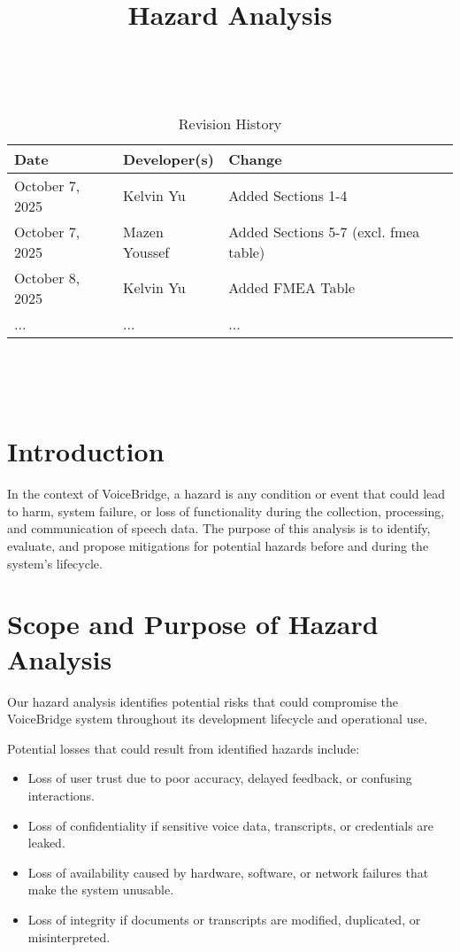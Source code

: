 \documentclass{article}
\title{Hazard Analysis\\\progname}
\author{\authname}
\date{}
\begin{document}
\maketitle
\thispagestyle{empty}

~\newpage


\begin{table}[hp]
\caption{Revision History} \label{TblRevisionHistory}
\begin{tabularx}{\textwidth}{llX}
\toprule
\textbf{Date} & \textbf{Developer(s)} & \textbf{Change}\\
\midrule
October 7, 2025 & Kelvin Yu & Added Sections 1-4\\
October 7, 2025 & Mazen Youssef & Added Sections 5-7 (excl. fmea table)\\
October 8, 2025 & Kelvin Yu & Added FMEA Table\\
... & ... & ...\\
\bottomrule
\end{tabularx}
\end{table}

~\newpage

\tableofcontents

~\newpage



\section{Introduction}

In the context of VoiceBridge, a hazard is any condition or event that could lead to harm, system failure, or loss of functionality during the collection, processing, and communication of speech data. 
The purpose of this analysis is to identify, evaluate, and propose mitigations for potential hazards before and during the system’s lifecycle.


\section{Scope and Purpose of Hazard Analysis}

Our hazard analysis identifies potential risks that could compromise the VoiceBridge system throughout its development lifecycle and operational use.

\vspace{3mm}
\noindent Potential losses that could result from identified hazards include:
\begin{itemize}
    \item Loss of user trust due to poor accuracy, delayed feedback, or confusing interactions. 
    \item Loss of confidentiality if sensitive voice data, transcripts, or credentials are leaked.
    \item Loss of availability caused by hardware, software, or network failures that make the system unusable.
    \item Loss of integrity if documents or transcripts are modified, duplicated, or misinterpreted.
\end{itemize}
\end{document}
